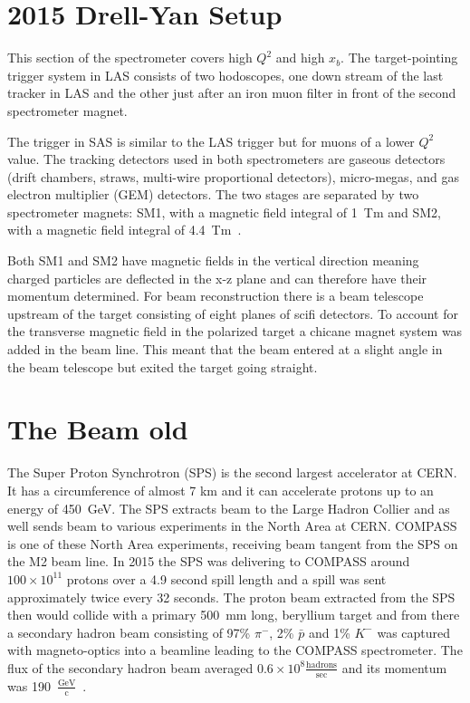 \section{2015 Drell-Yan Setup}


This section of the spectrometer covers high
$Q^2$ and high $x_b$.  The target-pointing trigger system in LAS consists of two
hodoscopes, one down stream of the last tracker in LAS and the other just after
an iron muon filter in front of the second spectrometer magnet.

The trigger in SAS is
similar to the LAS trigger but for muons of a lower $Q^2$ value.  The tracking
detectors used in both spectrometers are gaseous detectors (drift chambers,
straws, multi-wire proportional detectors), micro-megas, and gas electron
multiplier (GEM) detectors.  The two stages are separated by two spectrometer
magnets: SM1, with a magnetic field integral of 1~Tm and SM2, with a magnetic
field integral of 4.4~Tm~\cite{compassSpec}.

Both SM1 and SM2 have magnetic
fields in the vertical direction meaning charged particles are deflected in the
x-z plane and can therefore have their momentum determined.  For beam
reconstruction there is a beam telescope upstream of the target consisting of
eight planes of scifi detectors.  To account for the transverse magnetic field
in the polarized target a chicane magnet system was added in the beam line.
This meant that the beam entered at a slight angle in the beam telescope but
exited the target going straight. \par

\section{The Beam old}
The Super Proton Synchrotron (SPS) is the second largest accelerator
at CERN.  It has a circumference of almost 7 km and it can accelerate
protons up to an energy of 450~GeV.  The SPS extracts beam to the
Large Hadron Collier and as well sends beam to various experiments in
the North Area at CERN.  COMPASS is one of these North Area
experiments, receiving beam tangent from the SPS on the M2 beam line.
In 2015 the SPS was delivering to COMPASS around $100 \times 10^{11}$
protons over a 4.9 second spill length and a spill was sent
approximately twice every 32 seconds.  The proton beam extracted from
the SPS then would collide with a primary 500~mm long, beryllium
target and from there a secondary hadron beam consisting of 97\% $\pi
^-$, 2\% $\bar{p}$ and 1\% $K^-$ was captured with magneto-optics into
a beamline leading to the COMPASS spectrometer.  The flux of the
secondary hadron beam averaged $0.6 \times 10^8
\frac{\mathrm{hadrons}}{\mathrm{sec}}$ and its momentum was
190~$\frac{\mathrm{GeV}}{\mathrm{c}}$~\cite{compassDYpaper}.



